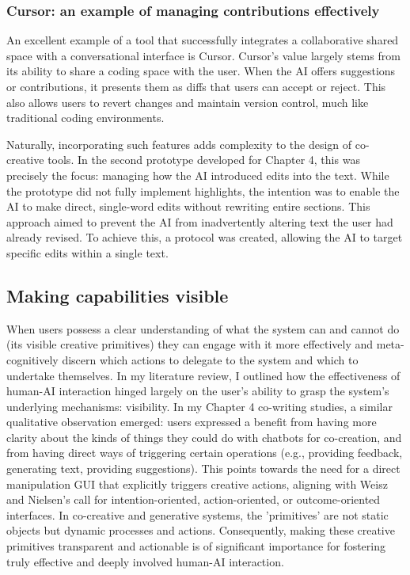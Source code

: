 \subsubsection{Cursor: an example of managing contributions effectively}
An excellent example of a tool that successfully integrates a collaborative shared space with a conversational interface is Cursor. Cursor's value largely stems from its ability to share a coding space with the user. When the AI offers suggestions or contributions, it presents them as diffs that users can accept or reject. This also allows users to revert changes and maintain version control, much like traditional coding environments.

Naturally, incorporating such features adds complexity to the design of co-creative tools. In the second prototype developed for Chapter 4, this was precisely the focus: managing how the AI introduced edits into the text. While the prototype did not fully implement highlights, the intention was to enable the AI to make direct, single-word edits without rewriting entire sections. This approach aimed to prevent the AI from inadvertently altering text the user had already revised. To achieve this, a protocol was created, allowing the AI to target specific edits within a single text.

\subsection{Making capabilities visible}

When users possess a clear understanding of what the system can and cannot do (its visible creative primitives) they can engage with it more effectively and meta-cognitively discern which actions to delegate to the system and which to undertake themselves. In my literature review, I outlined how the effectiveness of human-AI interaction hinged largely on the user's ability to grasp the system's underlying mechanisms: visibility. In my Chapter 4 co-writing studies, a similar qualitative observation emerged: users expressed a benefit from having more clarity about the kinds of things they could do with chatbots for co-creation, and from having direct ways of triggering certain operations (e.g., providing feedback, generating text, providing suggestions). This points towards the need for a direct manipulation GUI that explicitly triggers creative actions, aligning with Weisz and Nielsen's call for intention-oriented, action-oriented, or outcome-oriented interfaces. In co-creative and generative systems, the 'primitives' are not static objects but dynamic processes and actions. Consequently, making these creative primitives transparent and actionable is of significant importance for fostering truly effective and deeply involved human-AI interaction.

